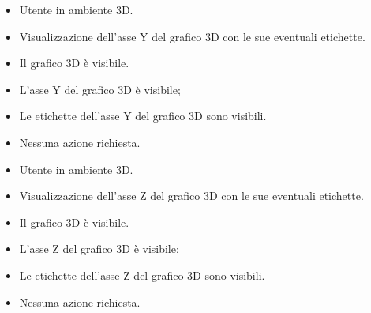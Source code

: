 \UCdsc
    { %
        \begin{itemize}
            \item Utente in ambiente 3D.
        \end{itemize}
    }
    { %
        \begin{itemize}
            \item Visualizzazione dell'asse Y del grafico 3D con le sue eventuali etichette.
        \end{itemize}
    }
    { %
        \begin{itemize}
            \item Il grafico 3D è visibile.
        \end{itemize}
    }
    { %
        \begin{itemize}
            \item L'asse Y del grafico 3D è visibile;
            \item Le etichette dell'asse Y del grafico 3D sono visibili.
        \end{itemize}
    }
    { %
        \begin{itemize}
            \item Nessuna azione richiesta.
        \end{itemize}
    }

\UCdsc
    { %
        \begin{itemize}
            \item Utente in ambiente 3D.
        \end{itemize}
    }
    { %
        \begin{itemize}
            \item Visualizzazione dell'asse Z del grafico 3D con le sue eventuali etichette.
        \end{itemize}
    }
    { %
        \begin{itemize}
            \item Il grafico 3D è visibile.
        \end{itemize}
    }
    { %
        \begin{itemize}
            \item L'asse Z del grafico 3D è visibile;
            \item Le etichette dell'asse Z del grafico 3D sono visibili.
        \end{itemize}
    }
    { %
        \begin{itemize}
            \item Nessuna azione richiesta.
        \end{itemize}
    }


